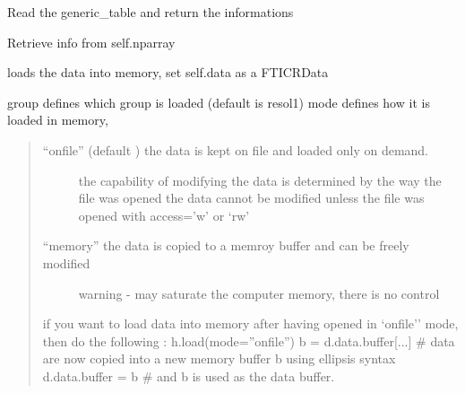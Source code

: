 \documentclass[letterpaper,10pt,openany,oneside]{sphinxmanual}
\begin{document}
\begin{fulllineitems}
\begin{fulllineitems}
\end{fulllineitems}


\begin{fulllineitems}
\label{rst/code:File.HDF5File.HDF5File.get_file_infos}
Read the generic\_table and return the informations

\end{fulllineitems}


\begin{fulllineitems}
\label{rst/code:File.HDF5File.HDF5File.get_info}
Retrieve info from self.nparray

\end{fulllineitems}


\begin{fulllineitems}
\label{rst/code:File.HDF5File.HDF5File.load}
loads the data into memory,
set self.data as a FTICRData

group defines which group is loaded (default is resol1)
mode defines how it is loaded in memory,
\begin{quote}
\begin{description}
\item[{``onfile'' (default ) the data is kept on file and loaded only on demand.}] \leavevmode
the capability of modifying the data is determined by the way the file was opened
the data cannot be modified unless the file was opened with access='w' or `rw'

\item[{``memory'' the data is copied to a memroy buffer and can be freely modified}] \leavevmode
warning - may saturate the computer memory, there is no control

\end{description}

if you want to load data into memory after having opened in `onfile'' mode, then do the following :
h.load(mode=''onfile'')
b = d.data.buffer{[}...{]}     \# data are now copied into a new memory buffer b using ellipsis syntax
d.data.buffer = b           \# and b is used as the data buffer.
\end{quote}


\end{fulllineitems}
\end{fulllineitems}
\end{document}
